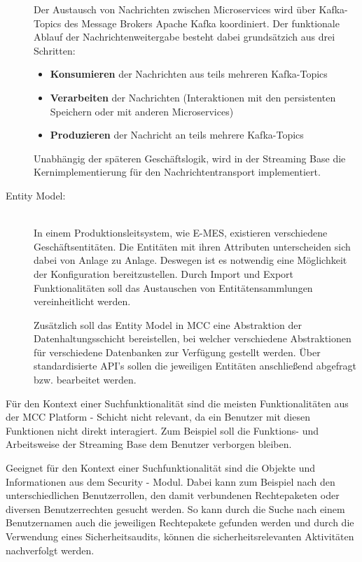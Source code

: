 \begin{description}
    Der Austausch von Nachrichten zwischen Microservices wird über Kafka-Topics des Message Brokers \glqq Apache Kafka\grqq{} koordiniert. Der funktionale Ablauf der Nachrichtenweitergabe besteht dabei grundsätzich aus drei Schritten:

    \begin{itemize}
        \item \textbf{Konsumieren} der Nachrichten aus teils mehreren Kafka-Topics
        \item \textbf{Verarbeiten} der Nachrichten (Interaktionen mit den persistenten Speichern oder mit anderen Microservices)
        \item \textbf{Produzieren} der Nachricht an teils mehrere Kafka-Topics
    \end{itemize}

    Unabhängig der späteren Geschäftslogik, wird in der \glqq Streaming Base\grqq{} die Kernimplementierung für den Nachrichtentransport implementiert.
    
    \item[Entity Model:]\hfill \\
    In einem Produktionsleitsystem, wie \glqq E-MES\grqq{}, existieren verschiedene Geschäftsentitäten. Die Entitäten mit ihren Attributen unterscheiden sich dabei von Anlage zu Anlage. Deswegen ist es notwendig eine Möglichkeit der Konfiguration bereitzustellen. Durch Import und Export Funktionalitäten soll das Austauschen von Entitätensammlungen vereinheitlicht werden.

    Zusätzlich soll das Entity Model in MCC eine Abstraktion der Datenhaltungsschicht bereistellen, bei welcher verschiedene Abstraktionen für verschiedene Datenbanken zur Verfügung gestellt werden. Über standardisierte API's sollen die jeweiligen Entitäten anschließend abgefragt bzw. bearbeitet werden.


\end{description}

Für den Kontext einer Suchfunktionalität sind die meisten Funktionalitäten aus der \glqq MCC Platform\grqq{} - Schicht nicht relevant, da ein Benutzer mit diesen Funktionen nicht direkt interagiert. Zum Beispiel soll die Funktions- und Arbeitsweise der \glqq Streaming Base\grqq{} dem Benutzer verborgen bleiben.

Geeignet für den Kontext einer Suchfunktionalität sind die Objekte und Informationen aus dem \glqq Security\grqq{} - Modul. Dabei kann zum Beispiel nach den unterschiedlichen Benutzerrollen, den damit verbundenen Rechtepaketen oder diversen Benutzerrechten gesucht werden. So kann durch die Suche nach einem Benutzernamen auch die jeweiligen Rechtepakete gefunden werden und durch die Verwendung eines Sicherheitsaudits, können die sicherheitsrelevanten Aktivitäten nachverfolgt werden.

